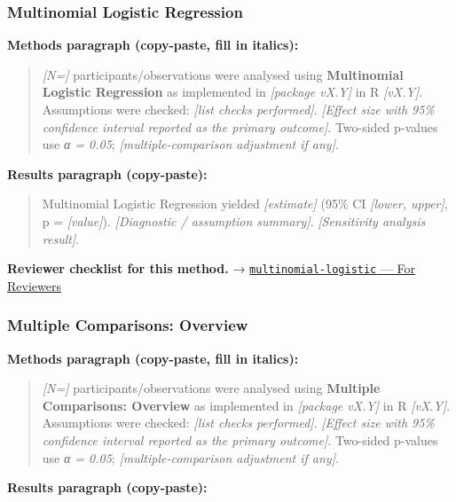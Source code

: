 \documentclass[
]{article}
\begin{document}
\subsubsection{Multinomial Logistic
Regression}\label{multinomial-logistic-regression}

\textbf{Methods paragraph (copy-paste, fill in italics):}

\begin{quote}
\emph{{[}N={]}} participants/observations were analysed using
\textbf{Multinomial Logistic Regression} as implemented in
\emph{{[}package vX.Y{]}} in R \emph{{[}vX.Y{]}}. Assumptions were
checked: \emph{{[}list checks performed{]}}. \emph{{[}Effect size with
95\% confidence interval reported as the primary outcome{]}}. Two-sided
p-values use \emph{α = 0.05}; \emph{{[}multiple-comparison adjustment if
any{]}}.
\end{quote}

\textbf{Results paragraph (copy-paste):}

\begin{quote}
Multinomial Logistic Regression yielded \emph{{[}estimate{]}} (95\% CI
\emph{{[}lower, upper{]}}, p = \emph{{[}value{]}}). \emph{{[}Diagnostic
/ assumption summary{]}}. \emph{{[}Sensitivity analysis result{]}}.
\end{quote}

\textbf{Reviewer checklist for this method.} →
\href{../chapters/07-regression/multinomial-logistic.Rmd\#for-reviewers}{\texttt{multinomial-logistic}
--- For Reviewers}

\subsubsection{Multiple Comparisons:
Overview}\label{multiple-comparisons-overview}

\textbf{Methods paragraph (copy-paste, fill in italics):}

\begin{quote}
\emph{{[}N={]}} participants/observations were analysed using
\textbf{Multiple Comparisons: Overview} as implemented in
\emph{{[}package vX.Y{]}} in R \emph{{[}vX.Y{]}}. Assumptions were
checked: \emph{{[}list checks performed{]}}. \emph{{[}Effect size with
95\% confidence interval reported as the primary outcome{]}}. Two-sided
p-values use \emph{α = 0.05}; \emph{{[}multiple-comparison adjustment if
any{]}}.
\end{quote}

\textbf{Results paragraph (copy-paste):}
\end{document}
